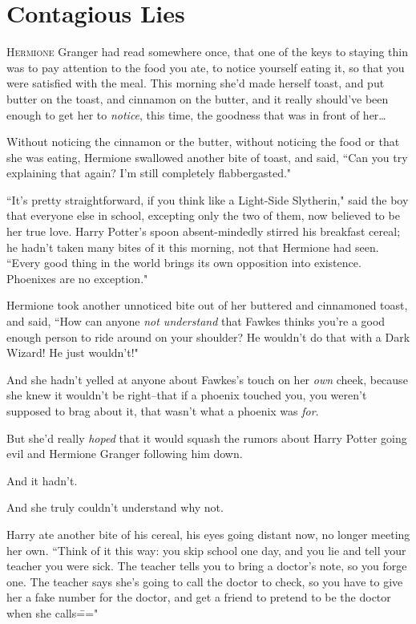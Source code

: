 \chapter{Contagious Lies}

\lettrine{H}{ermione} Granger had read somewhere once, that one of the keys to staying thin was to pay attention to the food you ate, to notice yourself eating it, so that you were satisfied with the meal. This morning she'd made herself toast, and put butter on the toast, and cinnamon on the butter, and it really should've been enough to get her to \emph{notice}, this time, the goodness that was in front of her{\ldots}

Without noticing the cinnamon or the butter, without noticing the food or that she was eating, Hermione swallowed another bite of toast, and said, ``Can you try explaining that again? I'm still completely flabbergasted."

``It's pretty straightforward, if you think like a Light-Side Slytherin," said the boy that everyone else in school, excepting only the two of them, now believed to be her true love. Harry Potter's spoon absent-mindedly stirred his breakfast cereal; he hadn't taken many bites of it this morning, not that Hermione had seen. ``Every good thing in the world brings its own opposition into existence. Phoenixes are no exception."

Hermione took another unnoticed bite out of her buttered and cinnamoned toast, and said, ``How can anyone \emph{not understand} that Fawkes thinks you're a good enough person to ride around on your shoulder? He wouldn't do that with a Dark Wizard! He just wouldn't!"

And she hadn't yelled at anyone about Fawkes's touch on her \emph{own} cheek, because she knew it wouldn't be right\---that if a phoenix touched you, you weren't supposed to brag about it, that wasn't what a phoenix was \emph{for}.

But she'd really \emph{hoped} that it would squash the rumors about Harry Potter going evil and Hermione Granger following him down.

And it hadn't.

And she truly couldn't understand why not.

Harry ate another bite of his cereal, his eyes going distant now, no longer meeting her own. ``Think of it this way: you skip school one day, and you lie and tell your teacher you were sick. The teacher tells you to bring a doctor's note, so you forge one. The teacher says she's going to call the doctor to check, so you have to give her a fake number for the doctor, and get a friend to pretend to be the doctor when she calls\==="

